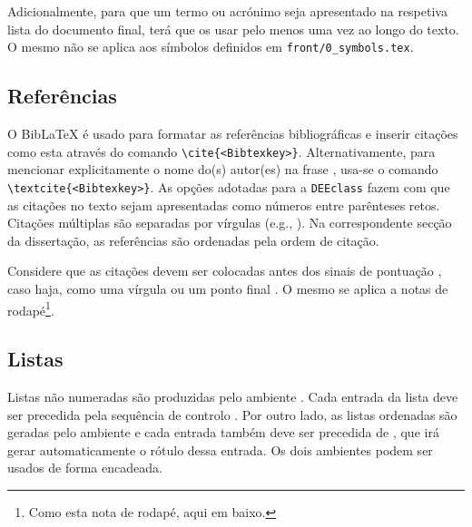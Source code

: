 Adicionalmente, para que um termo ou acrónimo seja apresentado na respetiva lista do documento final, terá que os usar pelo menos uma vez ao longo do texto. O mesmo não se aplica aos símbolos definidos em \verb|front/0_symbols.tex|.


\subsection{Referências}

O Bib\LaTeX{} é usado para formatar as referências bibliográficas e inserir citações como esta \cite{Gupta97} através do comando \verb|\cite{<Bibtexkey>}|. Alternativamente, para mencionar explicitamente o nome do(s) autor(es) na frase \textcite{Delorme1995}, usa-se o comando \verb|\textcite{<Bibtexkey>}|. As opções adotadas para a \verb|DEEclass| fazem com que as citações no texto sejam apresentadas como números entre parênteses retos. Citações múltiplas são separadas por vírgulas (e.g., \cite{Lipsum2008,Li2000,Candy1992}). Na correspondente secção da dissertação, as referências são ordenadas pela ordem de citação. 

Considere que as citações \cite{W3C2005,ATmega128A2019} devem ser colocadas antes dos sinais de pontuação \cite{Candy1992}, caso haja, como uma vírgula ou um ponto final \cite{IEA2024}. O mesmo se aplica a notas de rodapé\footnote{Como esta nota de rodapé, aqui em baixo.}.


\subsection{Listas}

Listas não numeradas são produzidas pelo ambiente . Cada entrada da lista deve ser precedida pela sequência de controlo . Por outro lado, as listas ordenadas são geradas pelo ambiente  e cada entrada também deve ser precedida de , que irá gerar automaticamente o rótulo dessa entrada. Os dois ambientes podem ser usados de forma encadeada.

